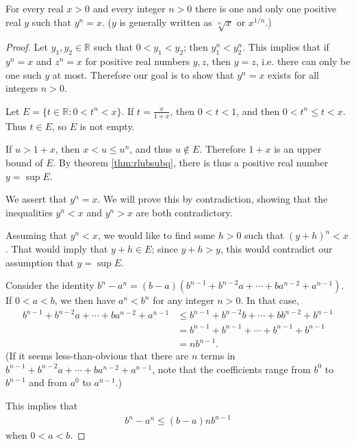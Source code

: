 \documentclass[12pt]{article}
\begin{document}
\begin{thm} \label{thm:uniqrealroots}
  For every real $x > 0$ and every integer $n > 0$ there is one and only one positive
  real $y$ such that $y^n = x$. ($y$ is generally written as $\sqrt[n]{x}$ or
  $x^{1/n}$.)

  \begin{proof}
    Let $y_1,y_2 \in \mathbb{R}$ such that $0 < y_1 < y_2$; then $y_1^n < y_2^n$.
    This implies that if $y^n = x$ and $z^n = x$ for positive real numbers $y,z$,
    then $y = z$, i.e. there can only be one such $y$ at most. Therefore our goal is
    to show that $y^n = x$ exists for all integers $n > 0$.

    Let $E = \{t \in \mathbb{R}: 0 < t^n < x\}$. If $t = \frac{x}{1 + x}$, then $0
    < t < 1$, and then $0 < t^n \leq t < x$. Thus $t \in E$, so $E$ is not empty.

    If $u > 1 + x$, then $x < u \leq u^n$, and thus $u \notin E$. Therefore $1 + x$
    is an upper bound of $E$. By theorem \ref{thm:rlubsubq}, there is thus a positive
    real number $y = \sup E$.

    We assert that $y^n = x$. We will prove this by contradiction, showing that the
    inequalities $y^n < x$ and $y^n > x$ are both contradictory.

    Assuming that $y^n < x$, we would like to find some $h > 0$ such that $(y + h)^n
    < x$. That would imply that $y + h \in E$; since $y + h > y$, this would
    contradict our assumption that $y = \sup E$.

    Consider the identity $b^n - a^n = (b - a)(b^{n - 1} + b^{n - 2}a + \cdots +
    ba^{n - 2} + a^{n - 1})$. If $0 < a < b$, we then have $a^n < b^n$ for any
    integer $n > 0$. In that case,
    \begin{align*}
      b^{n - 1} + b^{n - 2}a + \cdots + ba^{n - 2} + a^{n - 1}
      &\leq b^{n - 1} + b^{n - 2}b + \cdots + bb^{n - 2} + b^{n - 1}\\
      &= b^{n - 1} + b^{n - 1} + \cdots + b^{n - 1} + b^{n - 1}\\
      &= nb^{n - 1}.
    \end{align*}
    (If it seems less-than-obvious that there are $n$ terms in $b^{n - 1} + b^{n - 2}a
    + \cdots + ba^{n - 2} + a^{n - 1}$, note that the coefficients range from
    $b^0$ to $b^{n - 1}$ and from $a^0$ to $a^{n - 1}$.)

    This implies that
    \begin{align*}
      b^n - a^n \leq (b - a)nb^{n-1}
    \end{align*}
    when $0 < a < b$.


\end{proof}
\end{thm}
\end{document}
